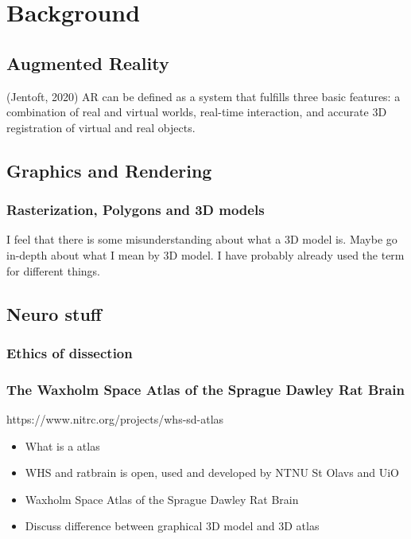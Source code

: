 


\chapter{Background}

\section{Augmented Reality}
(Jentoft, 2020) AR can be defined as a system that fulfills three basic features: a combination of real and virtual worlds, real-time interaction, and accurate 3D registration of virtual and real objects.

\section{Graphics and Rendering}

\subsection*{Rasterization, Polygons and 3D models}

{
    \color{BrickRed}
    I feel that there is some misunderstanding about what a 3D model is.
    Maybe go in-depth about what I mean by 3D model. I have probably already used the term for different things.
}

\section{Neuro stuff}

\subsection*{Ethics of dissection}\label{chap:ethics}

\subsection*{The Waxholm Space Atlas of the Sprague Dawley Rat Brain}\label{chap:ratbrain}

{
    \color{BrickRed}
https://www.nitrc.org/projects/whs-sd-atlas
\begin{itemize}
    \item What is a atlas
    \item WHS and ratbrain is open, used and developed by NTNU St Olavs and UiO 
    \item Waxholm Space Atlas of the Sprague Dawley Rat Brain 
    \item Discuss difference between graphical 3D model and 3D atlas
\end{itemize}
}


